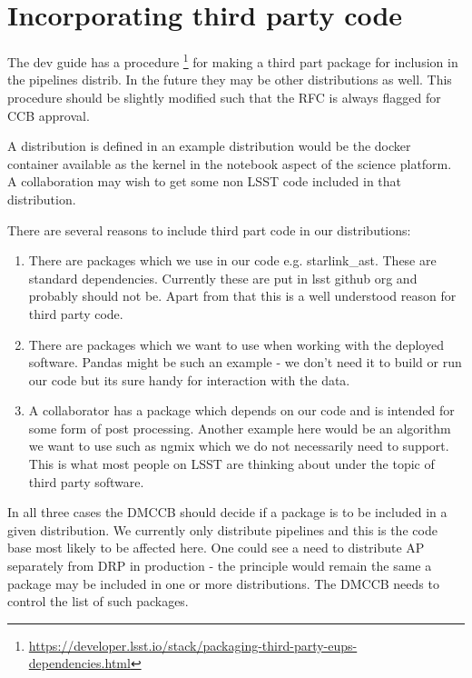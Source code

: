 \section{Incorporating third party code } \label{sec:party3}

The dev guide has a procedure \footnote{\url{https://developer.lsst.io/stack/packaging-third-party-eups-dependencies.html}}
for making a third part package for inclusion in the pipelines distrib. In the future they may be other distributions as well.
This procedure should be slightly modified such that the RFC is always flagged for CCB approval.

A distribution is defined in  an example distribution would be the docker container available as the kernel in the notebook aspect of the science platform. A collaboration may wish to get some  non LSST code included in that distribution.

There are several reasons to include third part code in our distributions:
\begin{enumerate}
\item There are packages which we use in our code e.g. starlink\_ast.  These are standard dependencies.  Currently these are put in lsst github org and probably should not be. Apart from that this is a well understood reason for third party code. \label{item:depend}
\item There are packages which we want to use when working with the deployed software. Pandas  might be such an example - we don't need it to build or run our code but its sure handy for interaction with the data.\label{item:want}
\item A collaborator has a package which depends on our code and is intended for some form of post processing. Another example here would be an algorithm we want to use such as ngmix which we do not necessarily need to support. This is what most people on LSST are thinking about under the topic of third party software. \label{item:colab}
\end{enumerate}


In all three cases the DMCCB should decide if a package is to be included in a given distribution. We currently only distribute pipelines and this is the code base most likely to be affected here. One could see a need to distribute AP separately from DRP in production - the principle would remain the same a package may be included in one or more distributions. The DMCCB needs to control the list of such packages.

